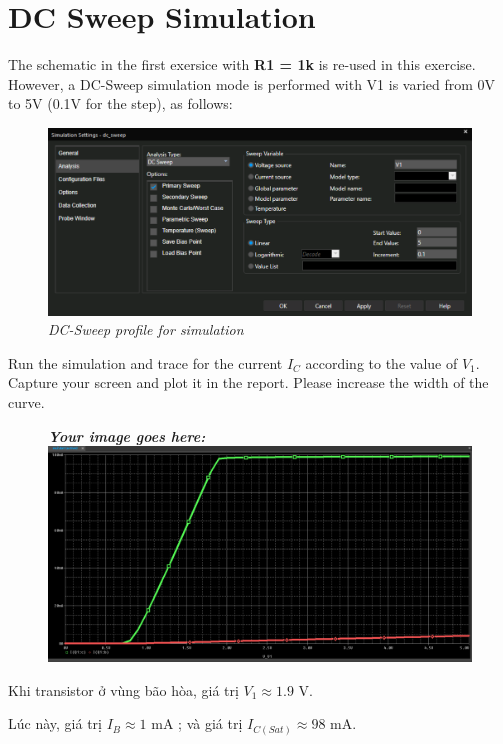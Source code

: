 \section{DC Sweep Simulation}
The schematic in the first exersice with \textbf{R1 = 1k} is re-used in this exercise. However, a DC-Sweep simulation mode is performed with V1 is varied from 0V to 5V (0.1V for the step), as follows:

\begin{figure}[!htp]
    \centering
    \includegraphics[width=0.8\linewidth]{graphics/ex2/f1.PNG}
    \caption{\textit{DC-Sweep profile for simulation}}
\end{figure}

Run the simulation and trace for the current $I_C$ according to the value of $V_1$. Capture your screen and plot it in the report. Please increase the width of the curve.

\begin{figure}[!htbp]
    \centering
    \textbf{\textit{Your image goes here:}}\\
    \includegraphics[width=1\linewidth]{graphics/ex2/f2.png}
\end{figure}

Khi transistor ở vùng bão hòa, giá trị \( V_1 \approx 1.9\) V.  

Lúc này, giá trị $I_B \approx  1 $ mA ; và giá trị $I_{C(Sat)} \approx 98 $ mA.